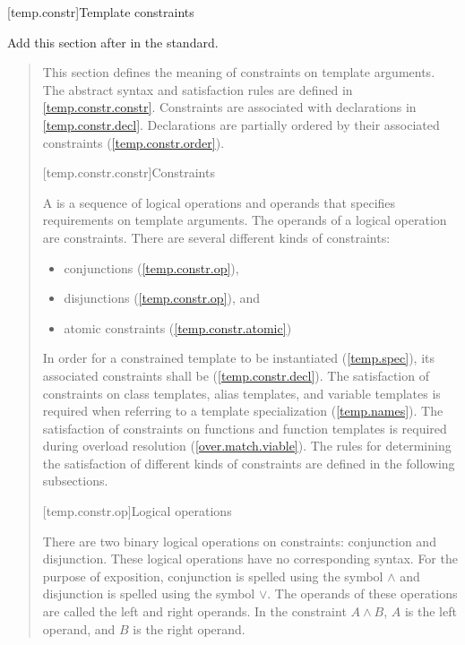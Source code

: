 
\setcounter{section}{9}
[temp.constr]{Template constraints}

Add this section after  in the \Cpp standard.

\begin{quote}
\begin{addedblock}

\pnum
\enternote
This section defines the meaning of constraints on template arguments.
% 
The abstract syntax and satisfaction rules are defined
in \ref{temp.constr.constr}. 
% 
Constraints are associated with declarations in \ref{temp.constr.decl}.
% 
Declarations are partially ordered by their associated constraints 
(\ref{temp.constr.order}).
\exitnote


[temp.constr.constr]{Constraints}

\pnum
A  is a sequence of logical operations and 
operands that specifies requirements on template arguments.
\enternote The operands of a logical operation are constraints. \exitnote
% 
There are several different kinds of constraints:
\begin{itemize}
\item conjunctions (\ref{temp.constr.op}),
\item disjunctions (\ref{temp.constr.op}), and
\item atomic constraints (\ref{temp.constr.atomic})
\end{itemize}

\pnum
In order for a constrained template to be instantiated (\ref{temp.spec}), its 
associated constraints shall be  (\ref{temp.constr.decl}).
% 
\enternote
The satisfaction of constraints on class templates, alias templates, 
and variable templates is required when referring to a template specialization 
(\ref{temp.names}). The satisfaction of constraints on functions and
function templates is required during overload resolution 
(\ref{over.match.viable}).
\exitnote
% 
The rules for determining the satisfaction of different kinds of 
constraints are defined in the following subsections.


[temp.constr.op]{Logical operations}

\pnum
There are two binary logical operations on constraints: conjunction
and disjunction.
% 
\enternote 
These logical operations have no corresponding \Cpp syntax.
For the purpose of exposition, conjunction is spelled
using the symbol $\land$ and disjunction is spelled using the 
symbol $\lor$. 
% 
The operands of these operations are called the left 
and right operands. In the constraint $A \land B$,
$A$ is the left operand, and $B$ is the right operand.
\exitnote


\end{addedblock}
\end{quote}
